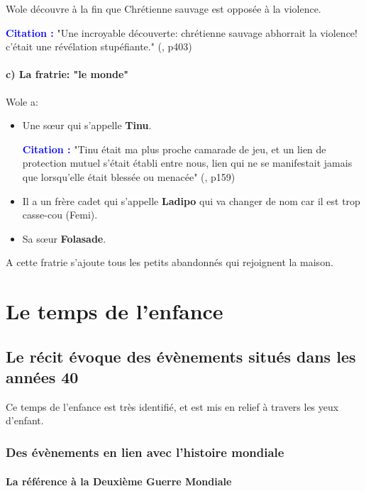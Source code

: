 \documentclass[a4paper, 11pt, hidelinks]{article}
\newcommand{\bs}{\bigskip}
\newcommand{\cit}{\large \textcolor{blue}{\textbf{Citation :}} \large }
\newcommand{\rb}[1]{\Romanbar{#1}}
\begin{document}
Wole découvre à la fin que Chrétienne sauvage est opposée à la violence.

\cit "Une incroyable découverte: chrétienne sauvage abhorrait la violence! c'était une révélation stupéfiante." (\rb{14}, p403)




\paragraph{c) La fratrie: "le monde"}


Wole a:

\begin{itemize}
    \item Une s\oe ur qui s'appelle \textbf{Tinu}.
\bs

    \cit "Tinu était ma plus proche camarade de jeu, et un lien de protection mutuel s'était établi entre nous, lien qui ne se manifestait jamais que 
    lorsqu'elle était blessée ou menacée" (\rb{6}, p159)
\bs

    \item Il a un frère cadet qui s'appelle \textbf{Ladipo} qui va changer de nom car il est trop casse-cou (Femi).
    \item Sa s\oe ur \textbf{Folasade}.
\end{itemize}


\bs
A cette fratrie s'ajoute tous les petits abandonnés qui rejoignent la maison.






\section{Le temps de l'enfance}


\subsection{Le récit évoque des évènements situés dans les années 40}
Ce temps de l'enfance est très identifié, et est mis en relief à travers les yeux d'enfant.



\subsubsection{Des évènements en lien avec l'histoire mondiale}



\paragraph{La référence à la Deuxième Guerre Mondiale}
\end{document}

